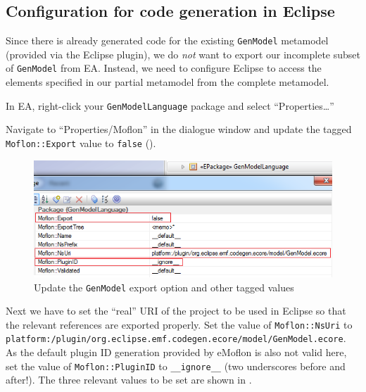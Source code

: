 \newpage

\subsection{Configuration for code generation in Eclipse}
\genHeader

Since there is already generated code for the existing \texttt{GenModel} metamodel (provided via the Eclipse plugin), we do \emph{not} want to export our
incomplete subset of \texttt{GenModel} from EA. Instead, we need to configure Eclipse to access the elements specified in our partial metamodel from the
complete metamodel.

\begin{stepbystep}

\item In EA, right-click your \texttt{GenModelLanguage} package and select ``Properties\ldots'' 

\item Navigate to ``Properties/Moflon'' in the dialogue window and update the tagged \texttt{Moflon::Export} value to \texttt{false}
().

\begin{figure}[htb]
\begin{center}  \includegraphics[width=\textwidth]{../../org.moflon.doc.handbook.05_miscellaneous/3_existingEMF/emfImages/ea_genModelExportFalse}
  \caption{Update the \texttt{GenModel} export option and other tagged values}  
  \label{fig_customNS}
\end{center}
\end{figure}

\item Next we have to set the ``real'' URI of the project to be used in Eclipse so that the relevant references are exported
properly. Set the value of \texttt{Moflon::NsUri} to \texttt{platform:/\-plugin/\-org.\-eclipse.\-emf.codegen.ecore/\-model/\-GenModel.ecore}.
As the default plugin ID generation provided by eMoflon is also not valid here, set the value of \texttt{Moflon::PluginID} to \texttt{\_\_ignore\_\_} (two underscores before and after!).
The three relevant values to be set are shown in .


\end{stepbystep}

